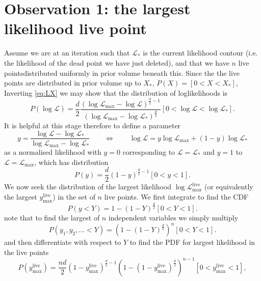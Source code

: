 \documentclass[usenatbib]{mnras}
\begin{document}
\section*{Observation 1: the largest likelihood live point}
Assume we are at an iteration such that $\mathcal{L}_*$ is the current likelihood contour (i.e. the likelihood of the dead point we have just deleted), and that we have $n$ live pointsdistributed uniformly in prior volume beneath this. 
Since the the live points are distributed in prior volume up to $X_*$, $P(X) = [0<X<X_*]$,
Inverting \cref{eq:LX} we may show that the distribution of loglikelihoods is
\begin{equation}
    P(\log\mathcal{L}) = \frac{d}{2}\frac{(\log\mathcal{L}_\mathrm{max}-\log\mathcal{L})^{\frac{d}{2}-1}}{(\log\mathcal{L}_\mathrm{max}-\log\mathcal{L}_*)^{\frac{d}{2}}}[0<\log\mathcal{L}<\log\mathcal{L}_*].
    \label{eq:PL}
\end{equation}
It is helpful at this stage therefore to define a parameter
\begin{equation}
    y = \frac{\log\mathcal{L}-\log\mathcal{L}_*}{\log\mathcal{L}_\mathrm{max}-\log\mathcal{L}_*} \qquad\Leftrightarrow\qquad \log\mathcal{L} = y\log\mathcal{L}_\mathrm{max} + (1-y)\log\mathcal{L}_*
    \label{eq:y}
\end{equation}
as a normalised likelihood with $y=0$ corresponding to $\mathcal{L}=\mathcal{L}_*$ and $y=1$ to $\mathcal{L}=\mathcal{L}_\mathrm{max}$, which has distribution
\begin{equation}
    P(y) = \frac{d}{2}(1-y)^{\frac{d}{2}-1}[0<y<1].
    \label{eq:Py}
\end{equation}
We now seek the distribution of the largest likelihood $\log{\mathcal{L}}_\mathrm{max}^\mathrm{live}$ (or equivalently the largest ${y}_\mathrm{max}^\mathrm{live}$) in the set of $n$ live points. We first integrate to find the CDF
\begin{equation}
    P(y<Y) = 1-(1-Y)^{\frac{d}{2}}[0<Y<1].
    \label{eq:Py}
\end{equation}
note that to find the largest of $n$ independent variables we simply multiply 
\begin{equation}
    P(y_1,y_2,\ldots<Y) = (1-(1-Y)^{\frac{d}{2}})^n[0<Y<1].
    \label{eq:Py}
\end{equation}
and then differentiate with respect to $Y$ to find the PDF for largest likelihood in the live points
\begin{equation}
    P(y_\mathrm{max}^\mathrm{live}) = \frac{nd}{2}(1-y_\mathrm{max}^\mathrm{live})^{\frac{d}{2}-1}\left(1-(1-y_\mathrm{max}^\mathrm{live})^{\frac{d}{2}}\right)^{n-1}[0<y_\mathrm{max}^\mathrm{live}<1],
    \label{eq:Pyhat}
\end{equation}
\end{document}
